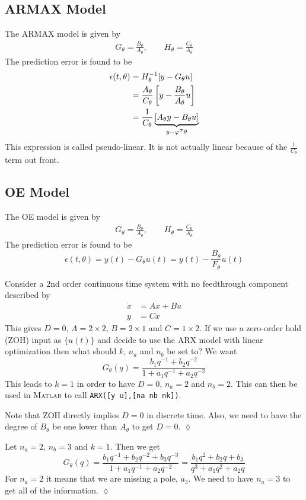 \subsection{ARMAX Model}
The ARMAX model is given by
\begin{align*}
G_\theta = \frac{B_\theta}{A_\theta}, \qquad H_\theta = \frac{C_\theta}{A_\theta}
\end{align*}
The prediction error is found to be
\begin{align*}
\epsilon(t,\theta) &= H_\theta^{-1}[y-G_\theta u] \\
&= \frac{A_\theta}{C_\theta}\left[y-\frac{B_\theta}{A_\theta}u\right] \\
&= \frac{1}{C_\theta}\underbrace{\left[A_\theta y-B_\theta u\right]}_{y-\varphi^T\theta}
\end{align*}
This expression is called pseudo-linear. It is not actually linear because of the $\frac{1}{C_\theta}$ term out front.

\subsection{OE Model}
The OE model is given by
\begin{align*}
G_\theta = \frac{B_\theta}{A_\theta}, \qquad H_\theta = \frac{C_\theta}{A_\theta}
\end{align*}
The prediction error is found to be
$$\epsilon(t,\theta) = y(t)-G_\theta u(t) = y(t)-\frac{B_\theta}{F_\theta}u(t)$$

\begin{example}
Consider a $2$nd order continuous time system with no feedthrough component described by
\begin{align*}
\dot{x} &= Ax + Bu \\
y &= Cx
\end{align*}
This gives $D=0$, $A=2\times 2$, $B=2\times 1$ and $C=1\times 2$. If we use a zero-order hold (ZOH) input as $\{u(t)\}$ and decide to use the ARX model with linear optimization then what should $k$, $n_a$ and $n_b$ be set to? We want
$$G_\theta(q) = \frac{b_1q^{-1}+b_2q^{-2}}{1+a_1q^{-1}+a_2q^{-2}}$$
This leads to $k=1$ in order to have $D=0$, $n_a=2$ and $n_b=2$. This can then be used in \textsc{Matlab} to call \texttt{ARX([y u],[na nb nk])}.

Note that ZOH directly implies $D=0$ in discrete time. Also, we need to have the degree of $B_\theta$ be one lower than $A_\theta$ to get $D=0$.
$\lozenge$
\end{example}

\begin{example}
Let $n_a=2$, $n_b=3$ and $k=1$. Then we get
$$G_\theta(q) = \frac{b_1q^{-1}+b_2q^{-2}+b_3q^{-3}}{1+a_1q^{-1}+a_2q^{-2}} = \frac{b_1q^2+b_2q+b_3}{q^3+a_1q^2+a_2q}$$
For $n_a=2$ it means that we are missing a pole, $a_3$. We need to have $n_a=3$ to get all of the information.
$\lozenge$
\end{example}

